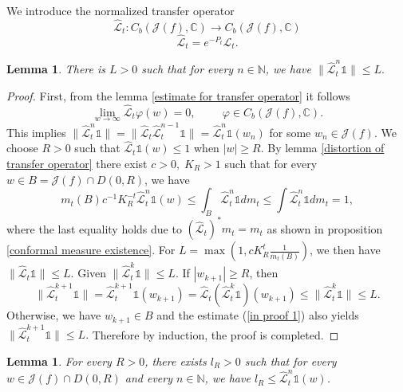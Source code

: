 \documentclass[12pt,reqno]{amsart}
\newtheorem{lemma}[theorem]{Lemma}
\begin{document}
\noindent We introduce the normalized transfer operator 
 $$\hat{\mathcal{L}}_t: C_b(\mathcal{J}(f),\mathbb{C}) \to C_b(\mathcal{J}(f),\mathbb{C})$$
$$\hat{\mathcal{L}}_t=e^{-P_t}\mathcal{L}_t.$$
\begin{lemma}\label{upper bound normalized transfer operator}
    There is $L>0$ such that for every $n \in \mathbb{N}$, we have $\|\hat{\mathcal{L}}_t^n\mathbb{1}\|\leq L.$
\end{lemma}
\begin{proof}
    First, from the lemma \ref{estimate for transfer operator} it follows 
    $$\lim_{w \to \infty} \hat{\mathcal{L}}_t \varphi(w)=0, \hspace{1cm} \varphi \in C_b \left(\mathcal{J}(f), \mathbb{C} \right).$$
    This implies $\| \hat{\mathcal{L}}_t^n \mathbb{1} \|=\| \hat{\mathcal{L}}_t \hat{\mathcal{L}}_t^{n-1} \mathbb{1} \|=\hat{\mathcal{L}}_t^n \mathbb{1}(w_n)$ for some $w_n\in \mathcal{J}(f)$.
    We choose $R>0$ such that $\hat{\mathcal{L}}_t \mathbb{1}(w) \leq 1$ when $|w|\geq R$.
    By lemma \ref{distortion of transfer operator} there exist $c>0, \;K_R>1$ such that for every $w\in B=\mathcal{J}(f)\cap D(0,R)$, we have
    \begin{equation}\label{in proof 1}
        m_t(B)c^{-1}K_R^{-t}\hat{\mathcal{L}}_t^n \mathbb{1}(w)\leq \int_B \hat{\mathcal{L}}_t^n \mathbb{1}dm_t\leq \int \hat{\mathcal{L}}_t^n \mathbb{1}dm_t=1,
    \end{equation}
    where the last equality holds due to $\left(\hat{\mathcal{L}}_t \right)^*m_t=m_t$ as shown in proposition \ref{conformal measure existence}. For $L=\max \left(1, cK_R ^t\frac{1}{m_t(B)}\right)$, we then have $\|\hat{\mathcal{L}}_t \mathbb{1} \| \leq L$. Given $\|\hat{\mathcal{L}}_t^k\mathbb{1}\|\leq L$. If $|w_{k+1}|\geq R$, then 
$$\|\hat{\mathcal{L}}_t^{k+1}\mathbb{1}\|=\hat{\mathcal{L}}_t^{k+1}\mathbb{1}(w_{k+1})=\hat{\mathcal{L}}_t \left(\hat{\mathcal{L}}_t^{k}\mathbb{1}\right)(w_{k+1})\leq \|\hat{\mathcal{L}}_t^k\mathbb{1}\|\leq L.$$
Otherwise, we have $w_{k+1}\in B$ and the estimate (\ref{in proof 1}) also yields $\|\hat{\mathcal{L}}_t^{k+1}\mathbb{1}\|\leq L.$ Therefore by induction, the proof is completed. 
    
\end{proof}
\begin{lemma}\label{lower bound normalized transfer operator}
    For every $R>0$, there exists $l_R>0$ such that for every  $w \in \mathcal{J}(f)\cap D(0,R)$ and every $n\in \mathbb{N}$, we have $l_R \leq \hat{\mathcal{L}}_t^n\mathbb{1}(w)$.
\end{lemma}
\end{document}
